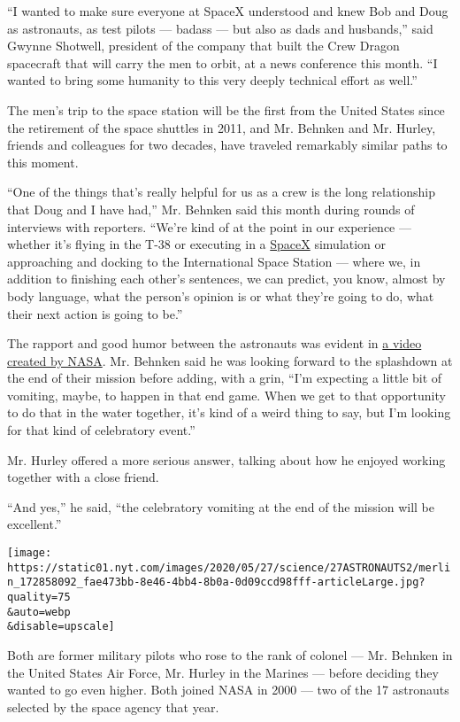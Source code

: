 ``I wanted to make sure everyone at SpaceX understood and knew Bob and
Doug as astronauts, as test pilots --- badass --- but also as dads and
husbands,'' said Gwynne Shotwell, president of the company that built
the Crew Dragon spacecraft that will carry the men to orbit, at a news
conference this month. ``I wanted to bring some humanity to this very
deeply technical effort as well.''

The men's trip to the space station will be the first from the United
States since the retirement of the space shuttles in 2011, and Mr.
Behnken and Mr. Hurley, friends and colleagues for two decades, have
traveled remarkably similar paths to this moment.

``One of the things that's really helpful for us as a crew is the long
relationship that Doug and I have had,'' Mr. Behnken said this month
during rounds of interviews with reporters. ``We're kind of at the point
in our experience --- whether it's flying in the T-38 or executing in a
\href{https://www.nytimes.com/2020/05/27/fashion/SpaceX-Dragon-Suits.html}{SpaceX}
simulation or approaching and docking to the International Space Station
--- where we, in addition to finishing each other's sentences, we can
predict, you know, almost by body language, what the person's opinion is
or what they're going to do, what their next action is going to be.''

The rapport and good humor between the astronauts was evident in
\href{https://www.youtube.com/watch?v=gu4o5KgnAQM}{a video created by
NASA}. Mr. Behnken said he was looking forward to the splashdown at the
end of their mission before adding, with a grin, ``I'm expecting a
little bit of vomiting, maybe, to happen in that end game. When we get
to that opportunity to do that in the water together, it's kind of a
weird thing to say, but I'm looking for that kind of celebratory
event.''

Mr. Hurley offered a more serious answer, talking about how he enjoyed
working together with a close friend.

``And yes,'' he said, ``the celebratory vomiting at the end of the
mission will be excellent.''

\texttt{[image: https://static01.nyt.com/images/2020/05/27/science/27ASTRONAUTS2/merlin\_172858092\_fae473bb-8e46-4bb4-8b0a-0d09ccd98fff-articleLarge.jpg?quality=75\\\&auto=webp\\\&disable=upscale]}

Both are former military pilots who rose to the rank of colonel --- Mr.
Behnken in the United States Air Force, Mr. Hurley in the Marines ---
before deciding they wanted to go even higher. Both joined NASA in 2000
--- two of the 17 astronauts selected by the space agency that year.

